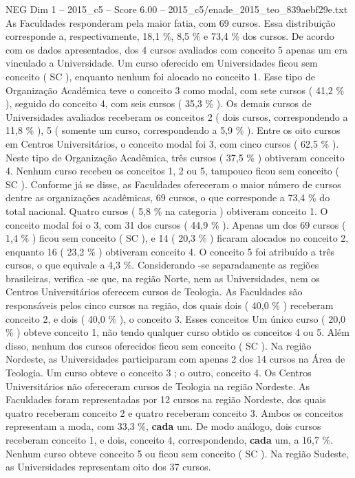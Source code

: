 \begin{textsample}{NEG Dim 1 – 2015\_c5 – Score 6.00 – 2015\_c5/enade\_2015\_teo\_839aebf29e.txt}
As Faculdades responderam pela maior fatia, com 69 cursos.
Essa distribuição corresponde a, respectivamente, 18,1 \%, 8,5 \% e 73,4 \% dos cursos.
De acordo com os dados apresentados, dos 4 cursos avaliados com conceito 5 apenas um era vinculado a Universidade.
Um curso oferecido em Universidades ficou sem conceito ( SC ), enquanto nenhum foi alocado no conceito 1.
Esse tipo de Organização Acadêmica teve o conceito 3 como modal, com sete cursos ( 41,2 \% ), seguido do conceito 4, com seis cursos ( 35,3 \% ).
Os demais cursos de Universidades avaliados receberam os conceitos 2 ( dois cursos, correspondendo a 11,8 \% ), 5 ( somente um curso, correspondendo a 5,9 \% ).
Entre os oito cursos em Centros Universitários, o conceito modal foi 3, com cinco cursos ( 62,5 \% ).
Neste tipo de Organização Acadêmica, três cursos ( 37,5 \% ) obtiveram conceito 4.
Nenhum curso recebeu os conceitos 1, 2 ou 5, tampouco ficou sem conceito ( SC ).
Conforme já se disse, as Faculdades ofereceram o maior número de cursos dentre as organizações acadêmicas, 69 cursos, o que corresponde a 73,4 \% do total nacional.
Quatro cursos ( 5,8 \% na categoria ) obtiveram conceito 1.
O conceito modal foi o 3, com 31 dos cursos ( 44,9 \% ).
Apenas um dos 69 cursos ( 1,4 \% ) ficou sem conceito ( SC ), e 14 ( 20,3 \% ) ficaram alocados no conceito 2, enquanto 16 ( 23,2 \% ) obtiveram conceito 4.
O conceito 5 foi atribuído a três cursos, o que equivale a 4,3 \%.
Considerando -se separadamente as regiões brasileiras, verifica -se que, na região Norte, nem as Universidades, nem os Centros Universitários oferecem cursos de Teologia.
As Faculdades são responsáveis pelos cinco cursos na região, dos quais dois ( 40,0 \% ) receberam conceito 2, e dois ( 40,0 \% ), o conceito 3.
Esses conceitos Um único curso ( 20,0 \% ) obteve conceito 1, não tendo qualquer curso obtido os conceitos 4 ou 5.
Além disso, nenhum dos cursos oferecidos ficou sem conceito ( SC ).
Na região Nordeste, as Universidades participaram com apenas 2 dos 14 cursos na Área de Teologia.
Um curso obteve o conceito 3 ; o outro, conceito 4.
Os Centros Universitários não ofereceram cursos de Teologia na região Nordeste.
As Faculdades foram representadas por 12 cursos na região Nordeste, dos quais quatro receberam conceito 2 e quatro receberam conceito 3.
Ambos os conceitos representam a moda, com 33,3 \%, \textbf{cada} um.
De modo análogo, dois cursos receberam conceito 1, e dois, conceito 4, correspondendo, \textbf{cada} um, a 16,7 \%.
Nenhum curso obteve conceito 5 ou ficou sem conceito ( SC ).
Na região Sudeste, as Universidades representam oito dos 37 cursos.

\end{textsample}
